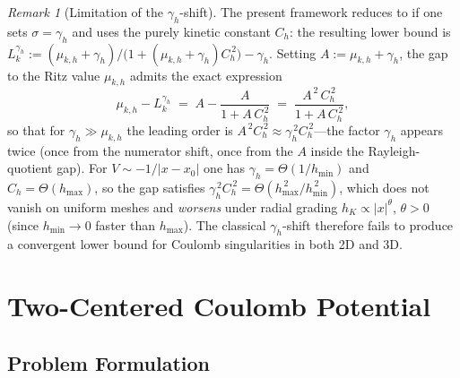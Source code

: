 \documentclass[11pt]{article}
\theoremstyle{plain}
\theoremstyle{definition}
\theoremstyle{remark}
\newtheorem{remark}{Remark}
\begin{document}
\begin{remark}[Limitation of the $\gamma_h$-shift]
\label{rmk:sigma-equals-gamma}
The present framework reduces to  if one
sets $\sigma=\gamma_h$ and uses the purely kinetic constant $C_h$:
the resulting lower bound is
$L_k^{\gamma_h}:=
(\mu_{k,h}+\gamma_h)/\bigl(1+(\mu_{k,h}+\gamma_h)C_h^{\,2}\bigr)
-\gamma_h$.  Setting $A:=\mu_{k,h}+\gamma_h$, the gap to the Ritz
value $\mu_{k,h}$ admits the exact expression
\begin{equation*}
  \mu_{k,h}-L_k^{\gamma_h}
  \;=\; A-\frac{A}{1+A\,C_h^{\,2}}
  \;=\; \frac{A^{\,2}\,C_h^{\,2}}{1+A\,C_h^{\,2}},
\end{equation*}
so that for $\gamma_h\gg\mu_{k,h}$ the leading order is
$A^{\,2}C_h^{\,2}\approx\gamma_h^{\,2}C_h^{\,2}$---the factor
$\gamma_h$ appears twice (once from the numerator shift, once from
the $A$ inside the Rayleigh-quotient gap). For
$V\sim-1/|x-x_0|$ one has $\gamma_h=\Theta(1/h_{\min})$ and
$C_h=\Theta(h_{\max})$, so the gap satisfies
$\gamma_h^{\,2}C_h^{\,2}=\Theta(h_{\max}^{\,2}/h_{\min}^{\,2})$,
which does not vanish on uniform meshes and \emph{worsens} under
radial grading $h_K\propto|x|^\theta$, $\theta>0$ (since
$h_{\min}\to 0$ faster than $h_{\max}$). The classical
$\gamma_h$-shift therefore fails to produce a convergent lower
bound for Coulomb singularities in both 2D and 3D.
\end{remark}

\section{Two-Centered Coulomb Potential}
\label{sec:twocenter}

\subsection{Problem Formulation}
\label{subsec:twocenter-formulation}
\end{document}
